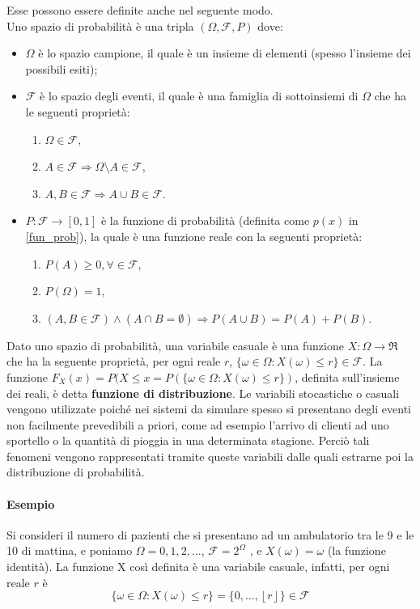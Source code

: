 \noindent Esse possono essere definite anche nel seguente modo.\\
Uno spazio di probabilità è una tripla $(\Omega, \mathcal{F}, P)$ dove:
\begin{itemize}
    \item $\Omega$ è lo spazio campione, il quale è un insieme di elementi (spesso l'insieme dei possibili esiti);
    \item $\mathcal{F}$ è lo spazio degli eventi, il quale è una famiglia di sottoinsiemi di $\Omega$ che ha le seguenti proprietà:
    \begin{enumerate}
        \item  $\Omega \in \mathcal{F} $,
        \item $A \in \mathcal{F} \Rightarrow \Omega \setminus A \in \mathcal{F}$,
        \item $A,B \in \mathcal{F} \Rightarrow A \cup B \in \mathcal{F} $.
    \end{enumerate}
    \item $P: \mathcal{F} \rightarrow [0,1]$ è la funzione di probabilità (definita come $p(x)$ in \ref{fun_prob}), la quale è una funzione reale con la seguenti proprietà:
    \begin{enumerate}
        \item $P(A) \geq  0 ,\forall \in \mathcal{F}$,
        \item $P(\Omega) = 1$,
        \item $(A, B \in \mathcal{F}) \wedge(A \cap B=\emptyset) \Longrightarrow P(A \cup B)=P(A)+P(B)$.
    \end{enumerate}
\end{itemize}

Dato uno spazio di probabilità, una variabile casuale è una funzione $ X : \Omega \rightarrow \Re$ che ha la seguente proprietà, per ogni reale $r$, $\{\omega \in \Omega: X(\omega) \leq r\} \in \mathcal{F}$. La funzione $F_X(x) = P(X \leq x = P( \{\omega \in \Omega: X(\omega) \leq r\})$, definita sull'insieme dei reali, è detta \textbf{funzione di distribuzione}.
Le variabili stocastiche o casuali vengono utilizzate poiché nei sistemi da simulare spesso si presentano degli eventi non facilmente prevedibili a priori, come ad esempio l'arrivo di clienti ad uno sportello o la quantità di pioggia in una determinata stagione. Perciò tali fenomeni vengono rappresentati tramite queste variabili dalle quali estrarne poi la distribuzione di probabilità.

\paragraph{Esempio} Si consideri il numero di pazienti che si presentano ad un
ambulatorio tra le 9 e le 10 di mattina, e poniamo $\Omega = {0, 1, 2, . . .}$, $\mathcal{F}= 2^\Omega$ ,
e $X(\omega) = \omega$ (la funzione identità). La funzione X così definita è una variabile
casuale, infatti, per ogni reale $r$ è
\[ \{\omega \in \Omega: X(\omega) \leq r\} = \{0,...,\left \lfloor r \right \rfloor\} \in \mathcal{F}\]


